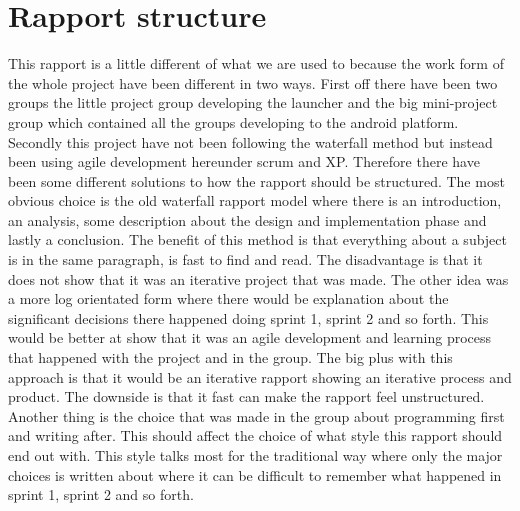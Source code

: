 \section{Rapport structure}

This rapport is a little different of what we are used to because the work form of the whole project have been different in two ways. First off there have been two groups the little project group developing the launcher and the big mini-project group which contained all the groups developing to the android platform. Secondly this project have not been following the waterfall method but instead been using agile development hereunder scrum and XP.
Therefore there have been some different solutions to how the rapport should be structured. The most obvious choice is the old waterfall rapport model where there is an introduction, an analysis, some description about the design and implementation phase and lastly a conclusion. The benefit of this method is that everything about a subject is in the same paragraph, is fast to find and read. The disadvantage is that it does not show that it was an iterative project that was made.
The other idea was a more log orientated form where there would be explanation about the significant decisions there happened doing sprint 1, sprint 2 and so forth. This would be better at show that it was an agile development and learning process that happened with the project and in the group. The big plus with this approach is that it would be an iterative rapport showing an iterative process and product. The downside is that it fast can make the rapport feel unstructured.
Another thing is the choice that was made in the group about programming first and writing after. This should affect the choice of what style this rapport should end out with. This style talks most for the traditional way where only the major choices is written about where it can be difficult to remember what happened in sprint 1, sprint 2 and so forth.